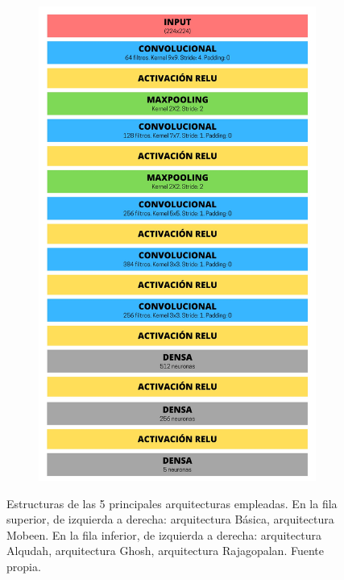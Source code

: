 \begin{figure}[!t]
\begin{subfigure}[t]{0.25\textwidth}
\end{subfigure}
\begin{subfigure}[t]{0.35\textwidth}
  \includegraphics[width=\textwidth]{img/estructura_rajagopalan.png}
\end{subfigure}

\caption{Estructuras de las 5 principales arquitecturas empleadas. En la fila superior, de izquierda a derecha: arquitectura Básica, arquitectura Mobeen. En la fila inferior, de izquierda a derecha: arquitectura Alqudah, arquitectura Ghosh, arquitectura Rajagopalan. Fuente propia.}
\label{fig:estructuras}
\end{figure}

